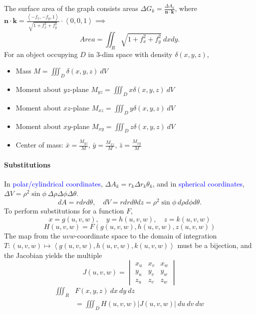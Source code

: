 The \textcolor{Bittersweet}{surface area of the graph} consists areas $\Delta
G_k=\frac{\Delta A_k}{\mathbf{n}\cdot \mathbf{k}}$, where $\mathbf{n\cdot
k}=\frac{\left<-f_x,-f_y,1 \right> }{\sqrt{1+f_x^{2}+f_y^{2}}}\cdot\left<0,0,1
\right>\implies$ \[Area=\iint_R \sqrt{1+f_x^{2}+f_y^{2}}\: d{x}d{y}.\]
For an object occupying $D$ in 3-dim space with density $\delta(x,y,z)$,
\begin{itemize}
  \item \textcolor{Bittersweet}{Mass} $M=\iiint_D\delta\left( x,y,z \right) \:d{V}$
  \item Moment about $yz$-plane $M_{yz}=\iiint_D x\delta\left( x,y,z \right) \:d{V}$
  \item Moment about $xz$-plane $M_{xz}=\iiint_D y\delta\left( x,y,z \right) \:d{V}$
  \item Moment about $xy$-plane $M_{xy}=\iiint_D z\delta\left( x,y,z \right) \:d{V}$
  \item \textcolor{Bittersweet}{Center of mass}: $\bar{x}=\frac{M_{yz}}{M}$, $\bar{y}=\frac{M_{xz}}{M}$, $\bar{z}=\frac{M_{xy}}{M}$
\end{itemize}

\paragraph{Substitutions}
In \textcolor{Blue}{polar/cylindrical coordinates}, $\Delta A_k=r_k\Delta
r_k\theta_k$, and in \textcolor{Blue}{spherical coordinates}, $\Delta
V=\rho^{2} \sin{\phi}\:\Delta\rho\Delta\phi\Delta\theta$.
\[d{A}=rd{r}d{\theta},\quad d{V}=rd{r}d{\theta}d{z}=\rho^{2}\sin{\phi}\:d{\rho}d{\phi}d{\theta}.\] 
To perform substitutions for a function $F$,
\[x=g\left( u,v,w \right),\quad y=h\left( u,v,w \right),\quad z=k\left( u,v,w
\right)\]
\[H(u,v,w)=F(g(u,v,w), h(u,v,w), z(u,v,w))\]
The map from the $uvw$-coordinate space to the domain of integration $T:\left( u,v,w \right)\mapsto \left<g(u,v,w), h(u,v,w), k(u,v,w)
\right>$ must be a bijection, and the \textcolor{Bittersweet}{Jacobian} yields
the multiple \[J\left( u,v,w \right)=\begin{vmatrix}
  x_u & x_v & x_w\\
  y_u & y_v & y_w\\
  z_u & z_v & z_w
\end{vmatrix}\]
\begin{align*}
  \iiint_R &F(x,y,z)\:dx\:dy\:dz\\&=\iiint_D H(u,v,w)\left| J(u,v,w) \right|\:du\:dv\:dw
\end{align*}
